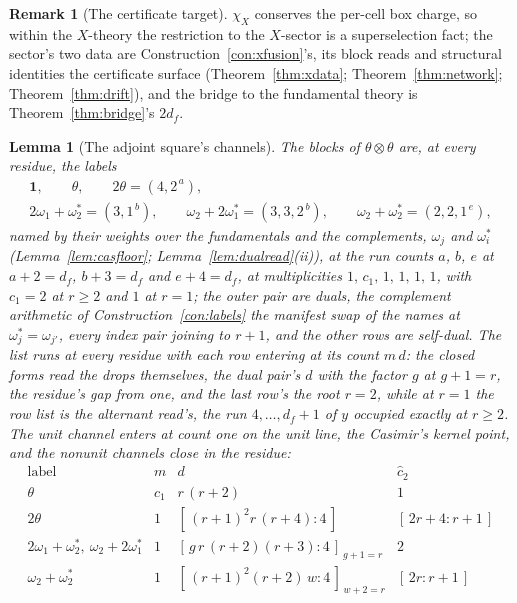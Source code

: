 \documentclass[11pt]{article}
\newtheorem{lemma}{Lemma}
\theoremstyle{definition}
\newtheorem{remark}{Remark}
\begin{document}
\begin{remark}[The certificate target]
\label{rem:certtarget}
$\chi_X$ conserves the per-cell box charge, so within the $X$-theory the
restriction to the $X$-sector is a superselection fact;
the sector's two data are Construction~\ref{con:xfusion}'s, its
block reads and structural identities the certificate surface
(Theorem~\ref{thm:xdata}; Theorem~\ref{thm:network};
Theorem~\ref{thm:drift}), and the bridge
to the fundamental theory is Theorem~\ref{thm:bridge}'s $2d_f$.
\end{remark}

\begin{lemma}[The adjoint square's channels]\label{lem:channels}
The blocks of $\theta\otimes\theta$ are, at every residue, the labels
\[
\begin{gathered}
\mathbf 1,\qquad \theta,\qquad 2\theta=(4,2^{\,a}),\\
2\omega_1{+}\omega_2^*=(3,1^{\,b}),\qquad
\omega_2{+}2\omega_1^*=(3,3,2^{\,b}),\qquad
\omega_2{+}\omega_2^*=(2,2,1^{\,e}),
\end{gathered}
\]
named by their weights over the fundamentals and the complements,
$\omega_j$ and $\omega_i^*$ (Lemma~\ref{lem:casfloor};
Lemma~\ref{lem:dualread}(ii)), at the run counts $a$, $b$, $e$ at
$a+2=d_f$, $b+3=d_f$ and $e+4=d_f$, at multiplicities
$1,\,c_1,\,1,\,1,\,1,\,1$,
with $c_1=2$ at $r\ge2$ and $1$ at $r=1$; the outer pair are duals,
the complement arithmetic of Construction~\ref{con:labels} the
manifest swap of the names at $\omega_j^{\ast}=\omega_{j'}$, every
index pair joining to $r+1$, and the other rows are
self-dual. The list runs at every residue with each row entering
at its count $m\,d$: the closed forms read the drops themselves,
the dual
pair's $d$ with the factor $g$ at $g+1=r$, the residue's gap from one,
and the last
row's the root $r=2$, while at $r=1$ the row list is the
alternant read's, the run $4,\dots,d_f{+}1$ of $y$ occupied
exactly at $r\ge2$.
The unit channel enters at count one on the unit line, the
Casimir's kernel point, and the nonunit channels close in
the residue:
\[
\begin{array}{lccc}
\text{label} & m & d & \hat c_2\\
\hline
\theta & c_1 & r\,(r+2) & 1\\
2\theta & 1 & [\,(r+1)^2r\,(r+4):4\,] & [\,2r+4:r+1\,]\\
2\omega_1{+}\omega_2^*,\ \omega_2{+}2\omega_1^* & 1 &
[\,g\,r\,(r+2)(r+3):4\,]_{\,g+1=r} & 2\\
\omega_2{+}\omega_2^* & 1 & [\,(r+1)^2(r+2)\,w:4\,]_{\,w+2=r} & [\,2r:r+1\,]

\end{array}\]
\end{lemma}
\end{document}

